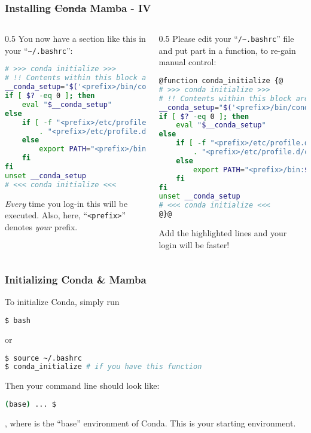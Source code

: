 \begin{frame}[fragile]
  \frametitle{Installing \sout{Conda} Mamba - IV}
  \footnotesize
  \begin{columns}[t]
    \begin{column}{0.5\textwidth}
       You now have a section like this in your ``\texttt{\textasciitilde/.bashrc}'':
       \begin{lstlisting}[language=Bash, style=Shell, basicstyle=\tiny, breaklines=true]
# >>> conda initialize >>>
# !! Contents within this block are managed by 'conda init' !!
__conda_setup="$('<prefix>/bin/conda' 'shell.bash' 'hook' 2> /dev/null)"
if [ $? -eq 0 ]; then
    eval "$__conda_setup"
else
    if [ -f "<prefix>/etc/profile.d/conda.sh" ]; then
        . "<prefix>/etc/profile.d/conda.sh"
    else
        export PATH="<prefix>/bin:$PATH"
    fi
fi
unset __conda_setup
# <<< conda initialize <<<
      \end{lstlisting}
      \bcattention \emph{Every} time you log-in this will be executed. Also, here, ``\texttt{<prefix>}'' denotes \emph{your} prefix.
    \end{column}
    \begin{column}{0.5\textwidth}
       \pause
       Please edit your ``\texttt{/\textasciitilde.bashrc}'' file and put part in a function, to re-gain manual control:
       \begin{lstlisting}[language=Bash, style=Shell, basicstyle=\tiny, breaklines=true]
@function conda_initialize {@
# >>> conda initialize >>>
# !! Contents within this block are managed by 'conda init' !!
__conda_setup="$('<prefix>/bin/conda' 'shell.bash' 'hook' 2> /dev/null)"
if [ $? -eq 0 ]; then
    eval "$__conda_setup"
else
    if [ -f "<prefix>/etc/profile.d/conda.sh" ]; then
        . "<prefix>/etc/profile.d/conda.sh"
    else
        export PATH="<prefix>/bin:$PATH"
    fi
fi
unset __conda_setup
# <<< conda initialize <<<
@}@
      \end{lstlisting}
      \bcattention Add the highlighted lines and your login will be faster!
    \end{column}
  \end{columns}
\end{frame}

\begin{frame}[fragile]
  \frametitle{Initializing Conda \& Mamba}
  To initialize Conda, simply run
  \begin{lstlisting}[language=Bash, style=Shell]
$ bash
  \end{lstlisting}
  or
  \begin{lstlisting}[language=Bash, style=Shell]
$ source ~/.bashrc
$ conda_initialize # if you have this function
  \end{lstlisting}
  Then your command line should look like:
  \begin{lstlisting}[language=Bash, style=Shell]
(base) ... $
  \end{lstlisting}
  , where  is the ``base'' environment of Conda. This is your starting environment.
\end{frame}

